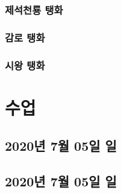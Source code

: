 \documentclass[12pt, a4paper, oneside]{book}
\let\stdsection\section
\renewcommand\section{\newpage\stdsection}
\begin{document}
	\subsection{ 제석천룡	탱화}
	\subsection{ 감로	탱화}
	\subsection{ 시왕	탱화}




	\chapter{ 수업 }
	\noptcrule

	\newpage	
	\minitoc



	\section{ 2020년 7월 05일 일 }




	\section{ 2020년 7월 05일 일 }










\end{document}

